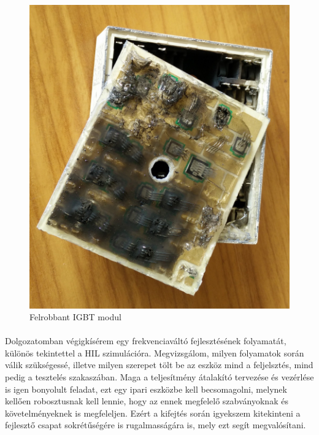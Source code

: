 \begin{figure}[H]
	\centering
	\includegraphics[scale = 0.1]{figures/IMG_20160415_134241.jpg}
	\caption{Felrobbant IGBT modul} 
	\label{fig:blown}
\end{figure}

\paragraph{}
Dolgozatomban végigkísérem egy frekvenciaváltó fejlesztésének folyamatát, különös tekintettel a HIL szimulációra. Megvizsgálom, milyen folyamatok során válik szükségessé, illetve milyen szerepet tölt be az eszköz mind a feljelsztés, mind pedig a tesztelés szakaszában. Maga a teljesítmény átalakító tervezése és vezérlése is igen bonyolult feladat, ezt egy ipari eszközbe kell becsomagolni, melynek kellően robosztusnak kell lennie, hogy az ennek megfelelő szabványoknak és követelményeknek is megfeleljen. Ezért a kifejtés során igyekszem kitekinteni a fejlesztő csapat sokrétűségére is rugalmasságára is, mely ezt segít megvalósítani.